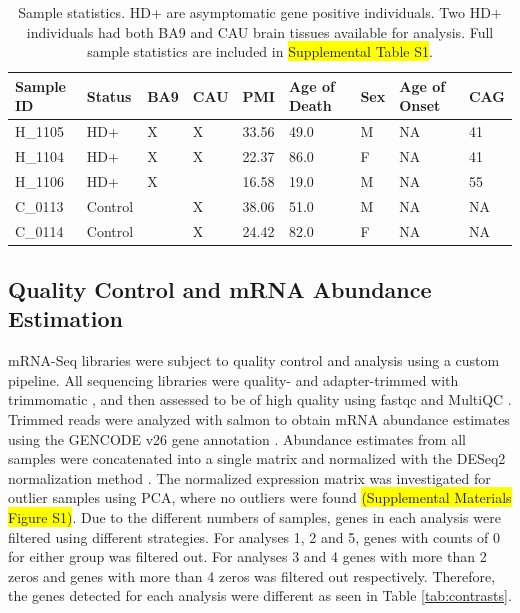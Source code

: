 \documentclass[fleqn,10pt,table]{wlscirep}
\newcommand{\todo}[1]{\colorbox{yellow}{#1}}
\begin{document}
\begin{table}[ht]
\centering
{}
\begin{tabular}{|l|l|l|l|l|l|l|l|l|}
\hline
Sample ID & Status  & BA9 & CAU & PMI   & Age of Death & Sex & Age of Onset & CAG  \\ \hline
H\_1105   & HD+      & X   & X   & 33.56 & 49.0         & M   & NA           & 41   \\
H\_1104   & HD+      & X   & X   & 22.37 & 86.0         & F   & NA           & 41   \\
H\_1106   & HD+      & X   &     & 16.58 & 19.0         & M   & NA           & 55   \\
C\_0113   & Control  &     & X   & 38.06 & 51.0         & M   & NA           & NA   \\
C\_0114   & Control  &     & X   & 24.42 & 82.0         & F   & NA           & NA   \\ \hline
\end{tabular}
\caption{Sample statistics. HD+ are asymptomatic gene positive individuals. Two HD+ individuals had both BA9 and CAU brain tissues available for analysis. Full sample statistics are included in \todo{Supplemental Table S1}. \label{tab:asymp_samples}}
\end{table}

\subsection{Quality Control and mRNA Abundance Estimation}
mRNA-Seq libraries were subject to quality control and analysis using a custom pipeline.
All sequencing libraries were quality- and adapter-trimmed with trimmomatic \cite{Bolger2014-fp}, and then assessed to be of high quality using fastqc \cite{fastqc} and MultiQC \cite{Ewels2016-qh}.
Trimmed reads were analyzed with salmon \cite{Patro2015-jg} to obtain mRNA abundance estimates using the GENCODE v26 gene annotation \cite{Harrow2012-fr}.
Abundance estimates from all samples were concatenated into a single matrix and normalized with the DESeq2 normalization method \cite{Love2014-nu}.
The normalized expression matrix was investigated for outlier samples using PCA, where no outliers were found \todo{(Supplemental Materials Figure S1)}.
Due to the different numbers of samples, genes in each analysis were filtered using different strategies.
For analyses 1, 2 and 5, genes with counts of 0 for either group was filtered out.
For analyses 3 and 4 genes with more than 2 zeros and genes with more than 4 zeros was filtered out respectively.
Therefore, the genes detected for each analysis were different as seen in Table \ref{tab:contrasts}.
\end{document}
